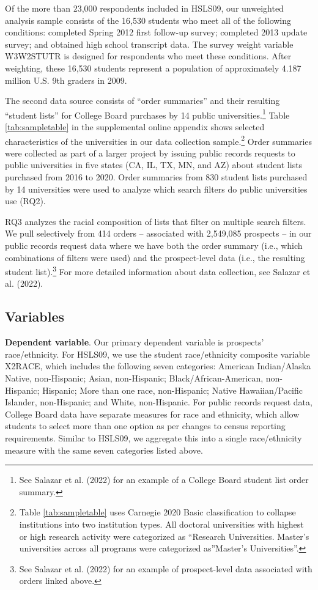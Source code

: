 \documentclass[
  12pt,
]{article}
\begin{document}
Of the more than 23,000 respondents included in HSLS09, our unweighted analysis sample consists of the 16,530 students who meet all of the following conditions: completed Spring 2012 first follow-up survey; completed 2013 update survey; and obtained high school transcript data. The survey weight variable W3W2STUTR is designed for respondents who meet these conditions. After weighting, these 16,530 students represent a population of approximately 4.187 million U.S. 9th graders in 2009.

The second data source consists of ``order summaries'' and their resulting ``student lists'' for College Board purchases by 14 public universities.\footnote{See Salazar et al. (2022) for an example of a College Board student list order summary.} Table \ref{tab:sampletable} in the supplemental online appendix shows selected characteristics of the universities in our data collection sample.\footnote{Table \ref{tab:sampletable} uses Carnegie 2020 Basic classification to collapse institutions into two institution types. All doctoral universities with highest or high research activity were categorized as ``Research Universities. Master's universities across all programs were categorized as''Master's Universities''.} Order summaries were collected as part of a larger project by issuing public records requests to public universities in five states (CA, IL, TX, MN, and AZ) about student lists purchased from 2016 to 2020. Order summaries from 830 student lists purchased by 14 universities were used to analyze which search filters do public universities use (RQ2).

RQ3 analyzes the racial composition of lists that filter on multiple search filters. We pull selectively from 414 orders -- associated with 2,549,085 prospects -- in our public records request data where we have both the order summary (i.e., which combinations of filters were used) and the prospect-level data (i.e., the resulting student list).\footnote{See Salazar et al. (2022) for an example of prospect-level data associated with orders linked above.} For more detailed information about data collection, see Salazar et al. (2022).

\hypertarget{variables}{%
\subsection{Variables}\label{variables}}

\textbf{Dependent variable}. Our primary dependent variable is prospects' race/ethnicity. For HSLS09, we use the student race/ethnicity composite variable X2RACE, which includes the following seven categories: American Indian/Alaska Native, non-Hispanic; Asian, non-Hispanic; Black/African-American, non-Hispanic; Hispanic; More than one race, non-Hispanic; Native Hawaiian/Pacific Islander, non-Hispanic; and White, non-Hispanic. For public records request data, College Board data have separate measures for race and ethnicity, which allow students to select more than one option as per changes to census reporting requirements. Similar to HSLS09, we aggregate this into a single race/ethnicity measure with the same seven categories listed above.
\end{document}
